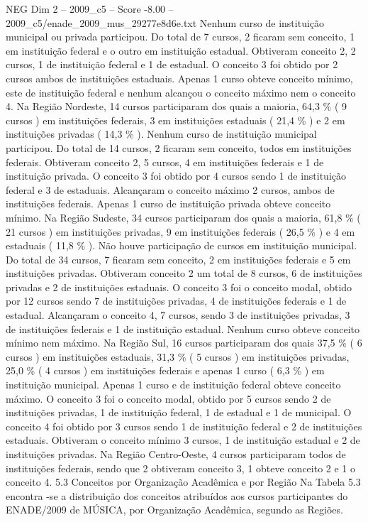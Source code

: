 \begin{textsample}{NEG Dim 2 – 2009\_c5 – Score -8.00 – 2009\_c5/enade\_2009\_mus\_29277e8d6e.txt}
Nenhum curso de instituição municipal ou privada participou.
Do total de 7 cursos, 2 ficaram sem conceito, 1 em instituição federal e o outro em instituição estadual.
Obtiveram conceito 2, 2 cursos, 1 de instituição federal e 1 de estadual.
O conceito 3 foi obtido por 2 cursos ambos de instituições estaduais.
Apenas 1 curso obteve conceito mínimo, este de instituição federal e nenhum alcançou o conceito máximo nem o conceito 4.
Na Região Nordeste, 14 cursos participaram dos quais a maioria, 64,3 \% ( 9 cursos ) em instituições federais, 3 em instituições estaduais ( 21,4 \% ) e 2 em instituições privadas ( 14,3 \% ).
Nenhum curso de instituição municipal participou.
Do total de 14 cursos, 2 ficaram sem conceito, todos em instituições federais.
Obtiveram conceito 2, 5 cursos, 4 em instituições federais e 1 de instituição privada.
O conceito 3 foi obtido por 4 cursos sendo 1 de instituição federal e 3 de estaduais.
Alcançaram o conceito máximo 2 cursos, ambos de instituições federais.
Apenas 1 curso de instituição privada obteve conceito mínimo.
Na Região Sudeste, 34 cursos participaram dos quais a maioria, 61,8 \% ( 21 cursos ) em instituições privadas, 9 em instituições federais ( 26,5 \% ) e 4 em estaduais ( 11,8 \% ).
Não houve participação de cursos em instituição municipal.
Do total de 34 cursos, 7 ficaram sem conceito, 2 em instituições federais e 5 em instituições privadas.
Obtiveram conceito 2 um total de 8 cursos, 6 de instituições privadas e 2 de instituições estaduais.
O conceito 3 foi o conceito modal, obtido por 12 cursos sendo 7 de instituições privadas, 4 de instituições federais e 1 de estadual.
Alcançaram o conceito 4, 7 cursos, sendo 3 de instituições privadas, 3 de instituições federais e 1 de instituição estadual.
Nenhum curso obteve conceito mínimo nem máximo.
Na Região Sul, 16 cursos participaram dos quais 37,5 \% ( 6 cursos ) em instituições estaduais, 31,3 \% ( 5 cursos ) em instituições privadas, 25,0 \% ( 4 cursos ) em instituições federais e apenas 1 curso ( 6,3 \% ) em instituição municipal.
Apenas 1 curso e de instituição federal obteve conceito máximo.
O conceito 3 foi o conceito modal, obtido por 5 cursos sendo 2 de instituições privadas, 1 de instituição federal, 1 de estadual e 1 de municipal.
O conceito 4 foi obtido por 3 cursos sendo 1 de instituição federal e 2 de instituições estaduais.
Obtiveram o conceito mínimo 3 cursos, 1 de instituição estadual e 2 de instituições privadas.
Na Região Centro-Oeste, 4 cursos participaram todos de instituições federais, sendo que 2 obtiveram conceito 3, 1 obteve conceito 2 e 1 o conceito 4. 5.3 Conceitos por Organização Acadêmica e por Região Na Tabela 5.3 encontra -se a distribuição dos conceitos atribuídos aos cursos participantes do ENADE/2009 de MÚSICA, por Organização Acadêmica, segundo as Regiões.

\end{textsample}
